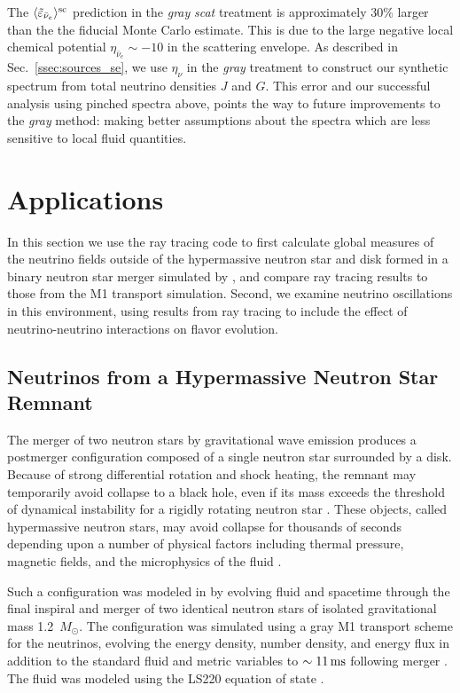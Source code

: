\documentclass[aps,floatfix,prd,superscriptaddress,twocolumn]{revtex4-1}
\begin{document}
The $\langle\tilde{\varepsilon}_{\bar{\nu}_e}\rangle^{\rm sc}$ prediction
in the \emph{gray} \emph{scat} treatment is approximately 30\%
larger than the the fiducial Monte Carlo estimate. This is
due to the large negative local chemical potential
$\eta_{\bar{\nu}_e}\sim-10$ in the scattering envelope.
As described in Sec.~\ref{ssec:sources_se},
we use $\eta_\nu$ in the \emph{gray} treatment to construct our
synthetic spectrum from total neutrino densities $J$ and $G$.
This error and our successful analysis using pinched spectra above,
points the way to future improvements to the \emph{gray} method:
making better assumptions about the spectra which are less sensitive
to local fluid quantities.

\section{Applications}
\label{sec:applications}

In this section we use the ray tracing code to
first calculate global measures
of the neutrino fields outside of the hypermassive neutron star and disk
formed in a binary neutron star merger simulated by
\cite{fouc2016-m1_nsns, fouc2016-m1_evolve_n},
and compare ray tracing results to those from the M1 transport simulation.
Second, we examine neutrino oscillations in this environment,
using results from ray tracing to include the effect of neutrino-neutrino
interactions on flavor evolution.

\subsection{Neutrinos from a Hypermassive Neutron Star Remnant}
\label{ssec:test_disk_comparison}
The merger of two neutron stars by gravitational wave emission produces a
postmerger configuration composed of a single neutron star surrounded by a disk.
Because of strong differential rotation and shock heating,
the remnant may temporarily avoid collapse to a black hole,
even if its mass exceeds the threshold of dynamical
instability for a rigidly rotating neutron star \cite{duez2009-review}.
These objects, called hypermassive neutron stars,
may avoid collapse for thousands of seconds
depending upon a number of physical factors including thermal pressure,
magnetic fields, and the microphysics of the fluid
\cite{rezz2015-two_winds,ravi2014-hmns_collapse}.

Such a configuration was modeled in \cite{fouc2016-m1_nsns} by
evolving fluid and spacetime through the
final inspiral and merger of two identical neutron stars of
isolated gravitational mass 1.2~$M_{\odot}$. The configuration
was simulated using a gray M1 transport scheme for the neutrinos, evolving the
energy density, number density, and energy flux in addition to the standard
fluid and metric variables to $\sim11\,{\rm ms}$ following merger
\cite{fouc2016-m1_evolve_n}.
The fluid was modeled using the LS220 equation of state \cite{latt1991-nuc_eos}.
\end{document}
